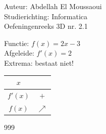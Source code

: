 \documentclass[a4paper]{article}
\begin{document}
  
\noindent \large Auteur: Abdellah El Moussaoui \\
\noindent \large Studierichting: Informatica\\
\noindent \large Oefeningenreeks 3D nr. 2.1\\

\medskip

\normalsize


Functie: $f(x) = 2x - 3$ \\

Afgeleide: $f'(x) = 2$ \\

Extrema: bestaat niet! \\



\begin{tabular}{c|c}
        $x$     & 				\\ \hline
        $f'(x)$ &  $+$  \\ 
        $f(x)$  & $\nearrow$\\
\end{tabular}
  
    

\begin{thebibliography}{999}
\end{thebibliography}
\end{document}
